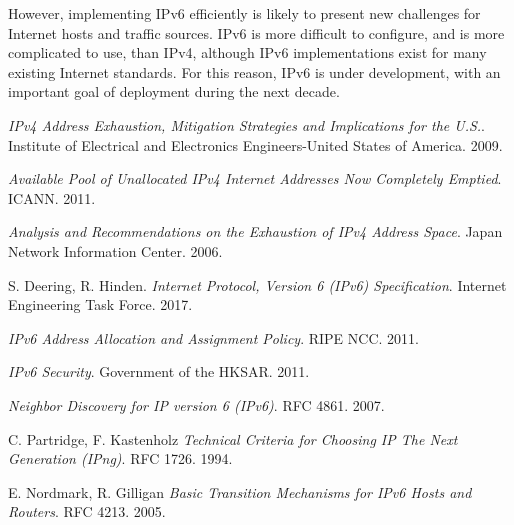 \documentclass[conference,12pt]{IEEEtran}
\begin{document}
However, implementing IPv6 efficiently is likely to present new challenges for Internet hosts and traffic sources. IPv6 is more difficult to configure, and is more complicated to use, than IPv4, although IPv6 implementations exist for many existing Internet standards. For this reason, IPv6 is under development, with an important goal of deployment during the next decade.


\begin{thebibliography}{9}
\textit{IPv4 Address Exhaustion, Mitigation Strategies and Implications for the U.S.}. 
Institute of Electrical and Electronics Engineers-United States of America. 2009.

\textit{Available Pool of Unallocated IPv4 Internet Addresses Now Completely Emptied}.
ICANN. 2011.

\textit{Analysis and Recommendations on the Exhaustion of IPv4 Address Space}.
Japan Network Information Center. 2006.

S. Deering, R. Hinden.
\textit{Internet Protocol, Version 6 (IPv6) Specification}.
Internet Engineering Task Force. 2017.

\textit{IPv6 Address Allocation and Assignment Policy}.
RIPE NCC. 2011.

\textit{IPv6 Security}.
Government of the HKSAR. 2011.

\textit{Neighbor Discovery for IP version 6 (IPv6)}.
RFC 4861. 2007.

C. Partridge, F. Kastenholz
\textit{Technical Criteria for Choosing IP The Next Generation (IPng)}.
RFC 1726. 1994.

E. Nordmark, R. Gilligan
\textit{Basic Transition Mechanisms for IPv6 Hosts and Routers}.
RFC 4213. 2005.
\end{thebibliography}
\end{document}
